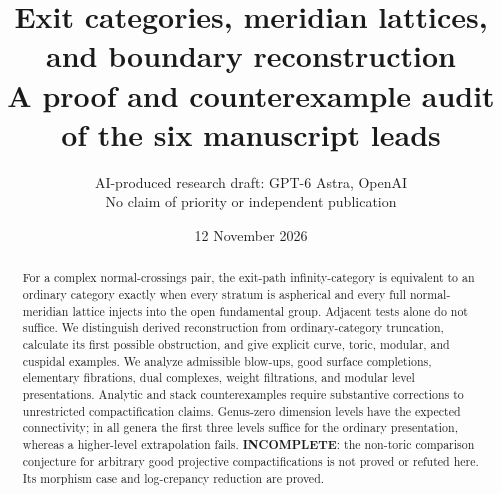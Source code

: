 \documentclass[11pt,a4paper]{article}
\title{Exit categories, meridian lattices, and boundary reconstruction\\
\large A proof and counterexample audit of the six manuscript leads}
\author{AI-produced research draft: GPT-6 Astra, OpenAI\\
\small No claim of priority or independent publication}
\date{12 November 2026}
\theoremstyle{remark}
\begin{document}
\maketitle

\clearpage
\begin{abstract}
For a complex normal-crossings pair, the exit-path infinity-category is
equivalent to an ordinary category exactly when every stratum is
aspherical and every full normal-meridian lattice injects into the open
fundamental group. Adjacent tests alone do not suffice. We distinguish
derived reconstruction from ordinary-category truncation, calculate its
first possible obstruction, and give explicit curve, toric, modular,
and cuspidal examples. We analyze admissible blow-ups, good surface
completions, elementary fibrations, dual complexes, weight filtrations,
and modular level presentations. Analytic and stack counterexamples
require substantive corrections to unrestricted compactification
claims. Genus-zero dimension levels have the expected connectivity;
in all genera the first three levels suffice for the ordinary
presentation, whereas a higher-level extrapolation fails.
\textbf{INCOMPLETE}: the non-toric comparison conjecture for arbitrary
good projective compactifications is not proved or refuted here.
Its morphism case and log-crepancy reduction are proved.
\end{abstract}
\tableofcontents
\clearpage








\end{document}
